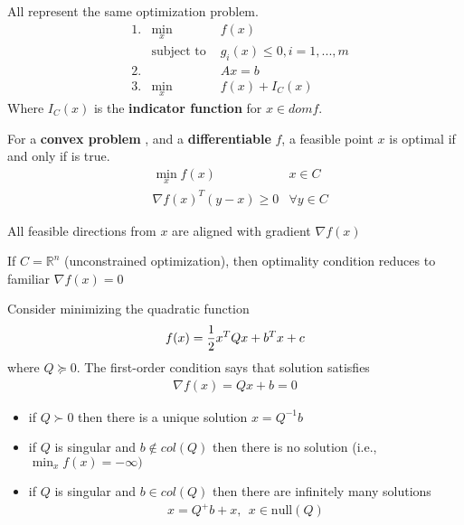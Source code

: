 \documentclass{article}
\begin{document}
\begin{headered_note}
  All represent the same optimization problem.
  \begin{align*}
     & 1. & \min_x             & f(x)                   \\
     &    & \text{subject to } & g_i(x)\leq 0,i=1,...,m \\
     & 2. &                    & Ax=b                   \\
     & 3. & \min_x             & f(x)+I_C(x)
  \end{align*}
  Where $I_C(x)$ is the \textbf{indicator function} for $x\in dom f$.
\end{headered_note}
\begin{theorem}
  For a \textbf{convex problem} , and a
  \textbf{differentiable} $f$, a feasible point $x$
  is optimal if and only if  is true.
  \begin{align}
    \label{eq:firstordopt}
    &\min_x f(x)&x\in C\\
    \label{eq:firstordoptdiff}
    &\nabla f(x)^T(y-x)\geq 0&\forall y\in C
  \end{align}
  \begin{headered_note}[Implications]
    All feasible directions from $x$ are aligned with gradient $\nabla f(x)$ 
  \end{headered_note}
  \begin{headered_note}
    If $C=\mathbb{R}^n$ (unconstrained optimization), then optimality condition
    reduces to familiar $\nabla f(x)=0$
  \end{headered_note}
\end{theorem}
\begin{headered_note}
  Consider minimizing the quadratic function
  \begin{align}
    f(x)={1\over2}x^TQx+b^Tx+c
  \end{align}
  where $Q\succeq0$.  The first-order condition says that solution satisfies
  \begin{align}
    \nabla f(x)=Qx+b=0
  \end{align}
  \begin{headered_note}[Cases:]
    \begin{itemize}
      \item if $Q\succ0$ then there is a unique solution $x=Q^{-1}b$
      \item if $Q$ is singular and $b\notin col(Q)$ then there is no solution
        (i.e., $\min_xf(x)=-\infty)$
      \item if $Q$ is singular and $b\in col(Q)$ then there are infinitely many solutions
        \begin{align}
          x=Q^+b+x,~~x\in \text{null}(Q)
        \end{align}
    \end{itemize}
  \end{headered_note}
\end{headered_note}
\end{document}
